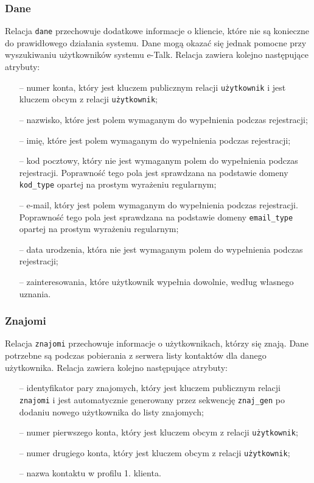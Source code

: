 \documentclass[a4paper,12pt]{article}
\begin{document}
\subsubsection[Dane]{Dane}
Relacja \texttt{dane} przechowuje dodatkowe informacje o kliencie, które nie są konieczne do prawidłowego działania systemu. Dane mogą okazać się jednak pomocne przy wyszukiwaniu użytkowników systemu e-Talk. Relacja zawiera kolejno następujące atrybuty:
\begin{itemize}
    \item[--] numer konta, który jest kluczem publicznym relacji \texttt{użytkownik} i jest kluczem obcym z relacji \texttt{użytkownik};
    \item[--] nazwisko, które jest polem wymaganym do wypełnienia podczas rejestracji;
    \item[--] imię, które jest polem wymaganym do wypełnienia podczas rejestracji;
    \item[--] kod pocztowy, który nie jest wymaganym polem do wypełnienia podczas rejestracji. Poprawność
              tego pola jest sprawdzana na podstawie domeny \texttt{kod\_type} opartej na prostym wyrażeniu
              regularnym;
    \item[--] e-mail, który jest polem wymaganym do wypełnienia podczas rejestracji. Poprawność
              tego pola jest sprawdzana na podstawie domeny \texttt{email\_type} opartej na prostym wyrażeniu
              regularnym;
    \item[--] data urodzenia, która nie jest wymaganym polem do wypełnienia podczas rejestracji;
    \item[--] zainteresowania, które użytkownik wypełnia dowolnie, według własnego uznania.
\end{itemize}

\subsubsection[Znajomi]{Znajomi}
Relacja \texttt{znajomi} przechowuje informacje o użytkownikach, którzy się znają. Dane potrzebne są podczas pobierania z serwera listy kontaktów dla danego użytkownika. Relacja zawiera kolejno następujące atrybuty:
\begin{itemize}
    \item[--] identyfikator pary znajomych, który jest kluczem publicznym relacji \texttt{znajomi} i jest automatycznie generowany przez sekwencję \texttt{znaj\_gen} po dodaniu nowego użytkownika do listy znajomych;
    \item[--] numer pierwszego konta, który jest kluczem obcym z relacji \texttt{użytkownik};
    \item[--] numer drugiego konta, który jest kluczem obcym z relacji \texttt{użytkownik};
    \item[--] nazwa kontaktu w profilu 1. klienta.
\end{itemize}
\end{document}
